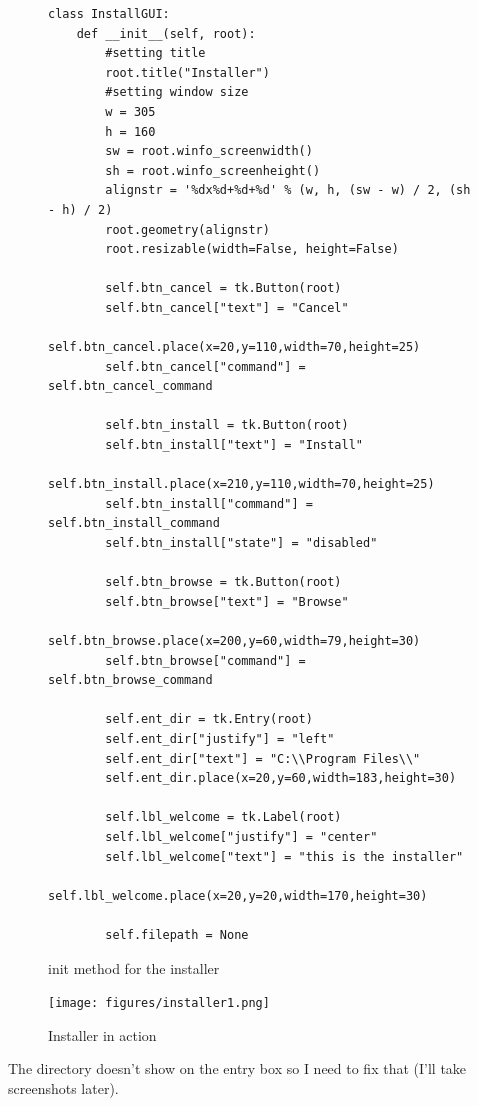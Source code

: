 \documentclass[11pt]{article}
\begin{document}
                \begin{figure}[!ht]
                   \begin{verbatim}
class InstallGUI:
    def __init__(self, root):
        #setting title
        root.title("Installer")
        #setting window size
        w = 305
        h = 160
        sw = root.winfo_screenwidth()
        sh = root.winfo_screenheight()
        alignstr = '%dx%d+%d+%d' % (w, h, (sw - w) / 2, (sh - h) / 2)
        root.geometry(alignstr)
        root.resizable(width=False, height=False)

        self.btn_cancel = tk.Button(root)
        self.btn_cancel["text"] = "Cancel"
        self.btn_cancel.place(x=20,y=110,width=70,height=25)
        self.btn_cancel["command"] = self.btn_cancel_command

        self.btn_install = tk.Button(root)
        self.btn_install["text"] = "Install"
        self.btn_install.place(x=210,y=110,width=70,height=25)
        self.btn_install["command"] = self.btn_install_command
        self.btn_install["state"] = "disabled"

        self.btn_browse = tk.Button(root)
        self.btn_browse["text"] = "Browse"
        self.btn_browse.place(x=200,y=60,width=79,height=30)
        self.btn_browse["command"] = self.btn_browse_command

        self.ent_dir = tk.Entry(root)
        self.ent_dir["justify"] = "left"
        self.ent_dir["text"] = "C:\\Program Files\\"
        self.ent_dir.place(x=20,y=60,width=183,height=30)

        self.lbl_welcome = tk.Label(root)
        self.lbl_welcome["justify"] = "center"
        self.lbl_welcome["text"] = "this is the installer"
        self.lbl_welcome.place(x=20,y=20,width=170,height=30)
        
        self.filepath = None
                   \end{verbatim}
                   \caption{init method for the installer}
                   \label{snip:install_gui_init}
                \end{figure}

                \begin{figure}[!ht]
                   \begin{center}
                       \texttt{[image: figures/installer1.png]}
                   \end{center}
                   \caption{Installer in action}
                   \label{fig:installer_gui}
                \end{figure}
                The directory doesn't show on the entry box so I need to fix that (I'll take screenshots later).
\end{document}
